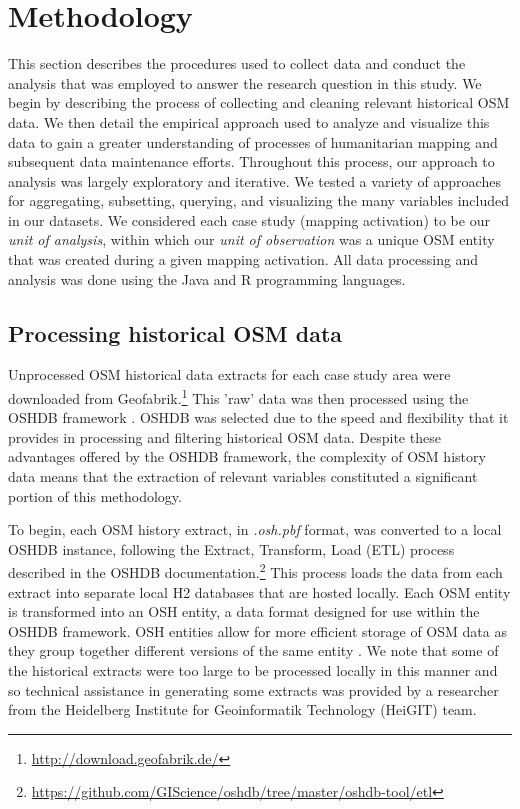 \chapter{Methodology}
\label{chapterlabel4}

This section describes the procedures used to collect data and conduct the analysis that was employed to answer the research question in this study. We begin by describing the process of collecting and cleaning relevant historical OSM data. We then detail the empirical approach used to analyze and visualize this data to gain a greater understanding of processes of humanitarian mapping and subsequent data maintenance efforts. Throughout this process, our approach to analysis was largely exploratory and iterative. We tested a variety of approaches for aggregating, subsetting, querying, and visualizing the many variables included in our datasets. We considered each case study (mapping activation) to be our \textit{unit of analysis}, within which our \textit{unit of observation} was a unique OSM entity that was created during a given mapping activation. All data processing and analysis was done using the Java and R programming languages.

\section{Processing historical OSM data}
\label{sec:history}

Unprocessed OSM historical data extracts for each case study area were downloaded from Geofabrik.\footnote{\url{http://download.geofabrik.de/}} This 'raw' data was then processed using the OSHDB framework \parencite{raifer_oshdb_2019}. OSHDB was selected due to the speed and flexibility that it provides in processing and filtering historical OSM data. Despite these advantages offered by the OSHDB framework, the complexity of OSM history data means that the extraction of relevant variables constituted a significant portion of this methodology. 

To begin, each OSM history extract, in \textit{.osh.pbf} format, was converted to a local OSHDB instance, following the Extract, Transform, Load (ETL) process described in the OSHDB documentation.\footnote{\url{https://github.com/GIScience/oshdb/tree/master/oshdb-tool/etl}} This process loads the data from each extract into separate local H2 databases that are hosted locally. Each OSM entity is transformed into an OSH entity, a data format designed for use within the OSHDB framework. OSH entities allow for more efficient storage of OSM data as they group together different versions of the same entity \parencite{raifer_oshdb_2019}. We note that some of the historical extracts were too large to be processed locally in this manner and so technical assistance in generating some extracts was provided by a researcher from the Heidelberg Institute for Geoinformatik Technology (HeiGIT) team. 

